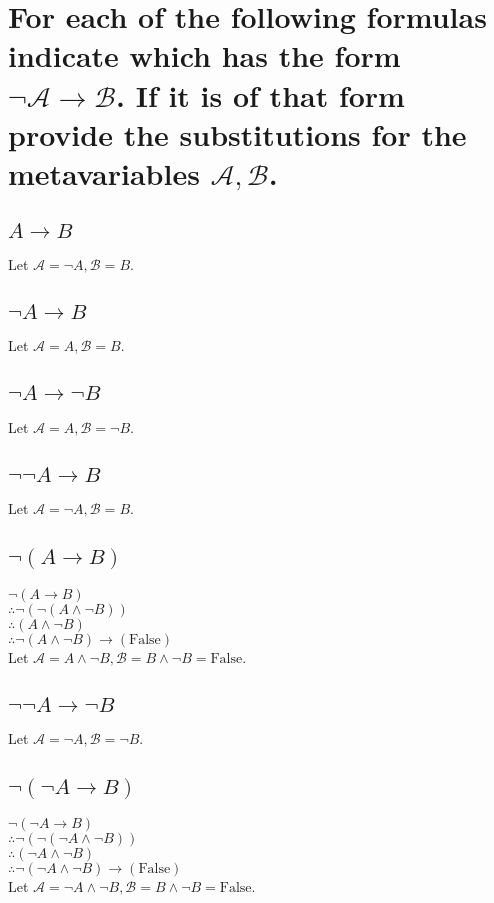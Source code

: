 \documentclass[10pt, letterpaper, titlepage]{article}
\newcommand{\A}{\mathscr{A}}
\newcommand{\B}{\mathscr{B}}
\begin{document}
    \newpage
    \section{For each of the following formulas indicate which has the form $\lnot \A \to \B$. If it is of
        that form provide the substitutions for the metavariables $\A ,\B$.}
        \begin{multicols}{2}
            \subsection{$A \to  B$}
                Let $\A = \lnot A, \B = B$.
            \subsection{$\lnot A \to  B$}
                Let $\A = A, \B = B$.
            \subsection{$\lnot A \to  \lnot B$}
                Let $\A = A, \B = \lnot B$.
            \subsection{$\lnot \lnot A \to  B$}
                Let $\A = \lnot A, \B = B$.
            \subsection{$\lnot (A \to  B)$}
                $\lnot (A \to  B)$\\
                $\therefore \lnot (\lnot (A \land \lnot B))$\\
                $\therefore (A \land \lnot B)$\\
                $\therefore \lnot(A \land \lnot B) \to (\text{False})$\\
                Let $\A = A \land \lnot B, \B = B \land \lnot B = \text{False}$.
            \subsection{$\lnot \lnot A \to  \lnot B$}
                Let $\A = \lnot A, \B = \lnot B$.
            \subsection{$\lnot (\lnot A \to  B)$}
                    $\lnot (\lnot A \to  B)$\\
                    $\therefore \lnot (\lnot (\lnot A \land \lnot B))$\\
                    $\therefore (\lnot A \land \lnot B)$\\
                    $\therefore \lnot(\lnot A \land \lnot B) \to (\text{False})$\\
                Let $\A = \lnot A \land \lnot B, \B = B \land \lnot B = \text{False}$.

\end{multicols}
\end{document}
